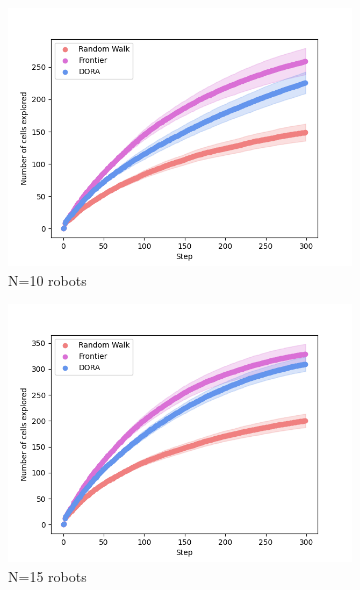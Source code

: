 \documentclass[letterpaper, 10 pt, conference]{ieeeconf}
\begin{document}
\begin{figure}
    \centering
    \begin{subfigure}{0.32\textwidth}
        \includegraphics[width=\textwidth]{images/explored_10.png}
        \caption{N=10 robots}
        \label{results:explored10}
    \end{subfigure}
    \begin{subfigure}{0.32\textwidth}
        \includegraphics[width=\textwidth]{images/explored_15.png}
        \caption{N=15 robots}
        \label{results:explored15}
    \end{subfigure}
    \begin{subfigure}{0.32\textwidth}

\end{subfigure}
\end{figure}
\end{document}
